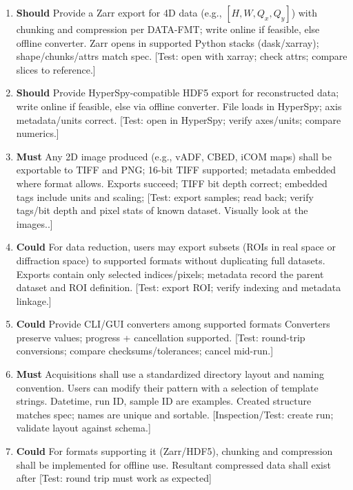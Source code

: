 \documentclass[12pt]{article}
\newcommand{\PriorityTag}[2]{%
  \colorbox{#2!25}{\footnotesize\textsf{\textbf{#1}}}\hspace{0.6em}}
\newcommand{\must}{\leavevmode\PriorityTag{Must}{green}}
\newcommand{\should}{\leavevmode\PriorityTag{Should}{yellow}}
\newcommand{\could}{\leavevmode\PriorityTag{Could}{cyan}}
\newcounter{reqgrp}[section] %
\newcounter{reqno}
\newcommand{\reqprefix}{GEN}
\newenvironment{requirements}[1]{%
  \renewcommand{\reqprefix}{#1}%
  \refstepcounter{reqgrp}%
  \setcounter{reqno}{0}%
  \begin{enumerate}[leftmargin=*]
}{\end{enumerate}}
\begin{document}
\begin{requirements}{OUT}
\item \should {}
  {Provide a Zarr export for 4D data (e.g., \([H,W,Q_x,Q_y]\)) with chunking and compression per DATA-FMT; write online if feasible, else offline converter.}
  {Zarr opens in supported Python stacks (dask/xarray); shape/chunks/attrs match spec.}
  [Test: open with xarray; check attrs; compare slices to reference.]

\item \should {}
  {Provide HyperSpy-compatible HDF5 export for reconstructed data; write online if feasible, else via offline converter.}
  {File loads in HyperSpy; axis metadata/units correct.}
  [Test: open in HyperSpy; verify axes/units; compare numerics.]

\item \must {}
  {Any 2D image produced (e.g., vADF, CBED, iCOM maps) shall be exportable to TIFF and PNG; 16-bit TIFF supported; metadata embedded where format allows.}
  {Exports succeed; TIFF bit depth correct; embedded tags include units and scaling; }
  [Test: export samples; read back; verify tags/bit depth and pixel stats of known dataset. Visually look at the images..]

\item \could {}
  {For data reduction, users may export subsets (ROIs in real space or diffraction space) to supported formats without duplicating full datasets.}
  {Exports contain only selected indices/pixels; metadata record the parent dataset and ROI definition.}
  [Test: export ROI; verify indexing and metadata linkage.]

\item \could {}
  {Provide CLI/GUI converters among supported formats}
  {Converters preserve values; progress + cancellation supported.}
  [Test: round-trip conversions; compare checksums/tolerances; cancel mid-run.]

\item \must {}
  {Acquisitions shall use a standardized directory layout and naming convention. Users can modify their pattern with a selection of template strings. Datetime, run ID, sample ID are examples.}
  {Created structure matches spec; names are unique and sortable.}
  [Inspection/Test: create run; validate layout against schema.]

\item \could {}
  {For formats supporting it (Zarr/HDF5), chunking and compression shall be implemented for offline use.}
  {Resultant compressed data shall exist after }
  [Test: round trip must work as expected]

\end{requirements}
\end{document}
